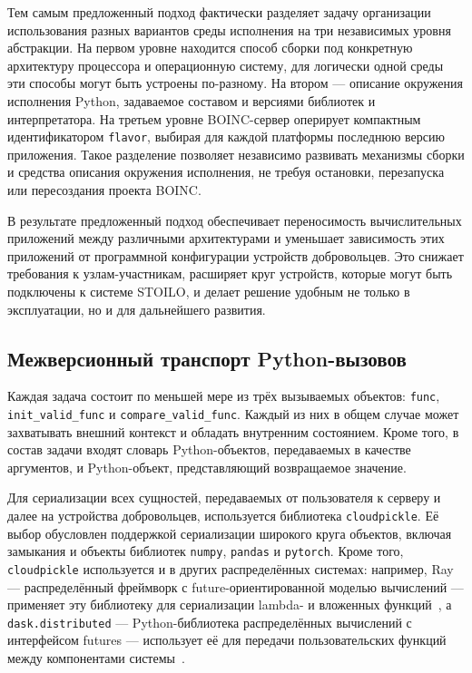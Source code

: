 \documentclass[a4paper,12pt]{extarticle}
\begin{document}
Тем самым предложенный подход фактически разделяет задачу организации использования разных вариантов среды исполнения на три независимых уровня абстракции.
На первом уровне находится способ сборки под конкретную архитектуру процессора и операционную систему, для логически одной среды эти способы могут быть устроены по-разному.
На втором — описание окружения исполнения Python, задаваемое составом и версиями библиотек и интерпретатора.
На третьем уровне BOINC-сервер оперирует компактным идентификатором \texttt{flavor}, выбирая для каждой платформы последнюю версию приложения.
Такое разделение позволяет независимо развивать механизмы сборки и средства описания окружения исполнения, не требуя остановки, перезапуска или пересоздания проекта BOINC.

В результате предложенный подход обеспечивает переносимость вычислительных приложений между различными архитектурами и уменьшает зависимость этих приложений от программной конфигурации устройств добровольцев.
Это снижает требования к узлам-участникам, расширяет круг устройств, которые могут быть подключены к системе STOILO, и делает решение удобным не только в эксплуатации, но и для дальнейшего развития.

\subsection{Межверсионный транспорт Python-вызовов}\label{subsec:transfer}

Каждая задача состоит по меньшей мере из трёх вызываемых объектов: \texttt{func}, \newline\texttt{init\_valid\_func} и \texttt{compare\_valid\_func}.
Каждый из них в общем случае может захватывать внешний контекст и обладать внутренним состоянием.
Кроме того, в состав задачи входят словарь Python-объектов, передаваемых в качестве аргументов, и Python-объект, представляющий возвращаемое значение.

Для сериализации всех сущностей, передаваемых от пользователя к серверу и далее на устройства добровольцев, используется библиотека \texttt{cloudpickle}.
Её выбор обусловлен поддержкой сериализации широкого круга объектов, включая замыкания и объекты библиотек \texttt{numpy}, \texttt{pandas} и \texttt{pytorch}.
Кроме того, \texttt{cloudpickle} используется и в других распределённых системах: например, Ray — распределённый фреймворк с future-ориентированной моделью вычислений — применяет эту библиотеку для сериализации lambda- и вложенных функций~\cite{ray_osdi18,ray_serialization}, а \texttt{dask.distributed} — Python-библиотека распределённых вычислений с интерфейсом futures — использует её для передачи пользовательских функций между компонентами системы~\cite{dask_distributed,dask_protocol}.
\end{document}
